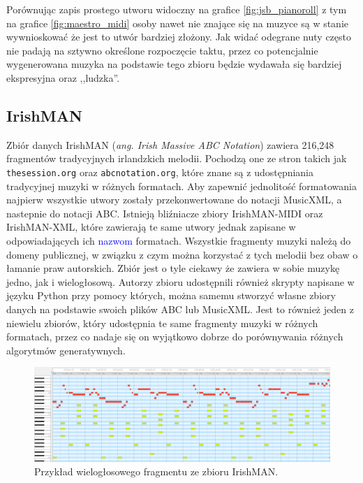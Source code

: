 \documentclass[data-science]{agh-wi} %
\begin{document}
Porównując zapis prostego utworu widoczny na grafice \ref*{fig:jsb_pianoroll} z tym na grafice \ref*{fig:maestro_midi} osoby nawet nie znające się na muzyce są w stanie wywnioskować że jest to utwór bardziej złożony. Jak widać odegrane nuty często nie padają na sztywno określone rozpoczęcie taktu, przez co potencjalnie wygenerowana muzyka na podstawie tego zbioru będzie wydawała się bardziej ekspresyjna oraz ,,ludzka''.

\subsection{IrishMAN}
Zbiór danych IrishMAN (\textit{ang. Irish Massive ABC Notation}) \cite{irishman} zawiera 216,248 fragmentów tradycyjnych irlandzkich melodii. Pochodzą one ze stron takich jak \texttt{thesession.org} oraz \texttt{abcnotation.org}, które znane są z udostępniania tradycyjnej muzyki w różnych formatach. Aby zapewnić jednolitość formatowania najpierw wszystkie utwory zostały przekonwertowane do notacji MusicXML, a nastepnie do notacji ABC. Istnieją bliźniacze zbiory IrishMAN-MIDI oraz IrishMAN-XML, które zawierają te same utwory jednak zapisane w odpowiadających ich \textcolor{blue}{nazwom} formatach. Wszystkie fragmenty muzyki należą do domeny publicznej, w związku z czym można korzystać z tych melodii bez obaw o łamanie praw autorskich. Zbiór jest o tyle ciekawy że zawiera w sobie muzykę jedno, jak i wielogłosową. Autorzy zbioru udostępnili również skrypty napisane w języku Python przy pomocy których, można samemu stworzyć własne zbiory danych na podstawie swoich plików ABC lub MusicXML. Jest to również jeden z niewielu zbiorów, który udostępnia te same fragmenty muzyki w różnych formatach, przez co nadaje się on wyjątkowo dobrze do porównywania różnych algorytmów generatywnych.

\begin{figure}[ht!]
    \begin{center}
        \includegraphics[width=0.9\linewidth]{./img/irishman_midi.png}
    \end{center}
    \caption{Przykład wielogłosowego fragmentu ze zbioru IrishMAN.}\label{fig:irish_midi}
\end{figure}
\end{document}
